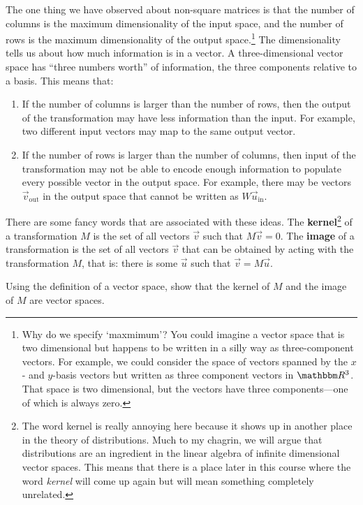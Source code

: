 \documentclass[12pt]{article}
\begin{document}
The one thing we have observed about non-square matrices is that the number of columns is the maximum dimensionality of the input space, and the number of rows is the maximum dimensionality of the output space.\footnote{Why do we specify `maxmimum'? You could imagine a vector space that is two dimensional but happens to be written in a silly way as three-component vectors. For example, we could consider the space of vectors spanned by the $x$- and $y$-basis vectors but written as three component vectors in $\RR ^3$. That space is two dimensional, but the vectors have three components---one of which is always zero.} The dimensionality tells us about how much information is in a vector. A three-dimensional vector space has ``three numbers worth'' of information, the three components relative to a basis. This means that:
\begin{enumerate}
    \item If the number of columns is larger than the number of rows, then the output of the transformation may have less information than the input. For example, two different input vectors may map to the same output vector.
    \item If the number of rows is larger than the number of columns, then input of the transformation may not be able to encode enough information to populate every possible vector in the output space. For example, there may be vectors $\vec{v}_\text{out}$ in the output space that cannot be written as $W\vec{u}_\text{in}$. 
\end{enumerate}
There are some fancy words that are associated with these ideas. The \textbf{kernel}\footnote{The word kernel is really annoying here because it shows up in another place in the theory of distributions. Much to my chagrin, we will argue that distributions are an ingredient in the linear algebra of infinite dimensional vector spaces. This means that there is a place later in this course where the word \emph{kernel} will come up again but will mean something completely unrelated.} of a transformation $M$ is the set of all vectors $\vec{v}$ such that $M\vec{v} = 0$. The \textbf{image} of a transformation is the set of all vectors $\vec{v}$ that can be obtained by acting with the transformation $M$, that is: there is some $\vec{u}$ such that $\vec{v} = M\vec{u}$.
\begin{exercise}
Using the definition of a vector space, show that the kernel of $M$ and the image of $M$ are vector spaces. 
\end{exercise}
\end{document}
